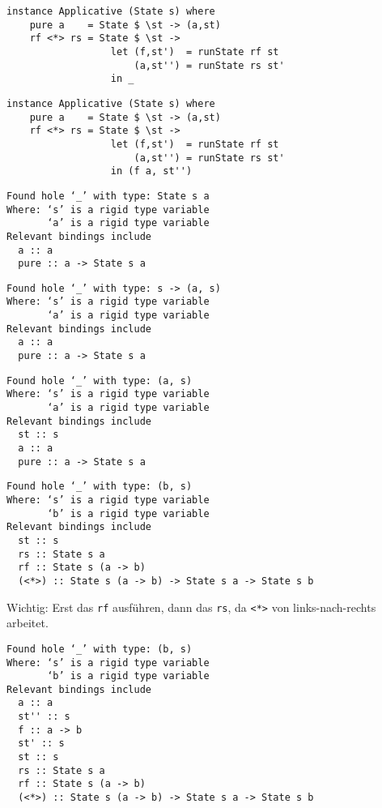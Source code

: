 \documentclass{beamer}
\begin{document}
\begin{frame}[fragile]
\begin{overprint}
\begin{verbatim}
\end{verbatim}
\begin{verbatim}
instance Applicative (State s) where
    pure a    = State $ \st -> (a,st)
    rf <*> rs = State $ \st ->
                  let (f,st')  = runState rf st
                      (a,st'') = runState rs st'
                  in _
\end{verbatim}
\begin{verbatim}
instance Applicative (State s) where
    pure a    = State $ \st -> (a,st)
    rf <*> rs = State $ \st ->
                  let (f,st')  = runState rf st
                      (a,st'') = runState rs st'
                  in (f a, st'')
\end{verbatim}
\end{overprint}
\bigskip
\scriptsize
\begin{overprint}
\begin{verbatim}
Found hole ‘_’ with type: State s a
Where: ‘s’ is a rigid type variable
       ‘a’ is a rigid type variable
Relevant bindings include
  a :: a
  pure :: a -> State s a
\end{verbatim}
\begin{verbatim}
Found hole ‘_’ with type: s -> (a, s)
Where: ‘s’ is a rigid type variable
       ‘a’ is a rigid type variable
Relevant bindings include
  a :: a
  pure :: a -> State s a
\end{verbatim}
\begin{verbatim}
Found hole ‘_’ with type: (a, s)
Where: ‘s’ is a rigid type variable
       ‘a’ is a rigid type variable
Relevant bindings include
  st :: s
  a :: a
  pure :: a -> State s a
\end{verbatim}
\begin{verbatim}
Found hole ‘_’ with type: (b, s)
Where: ‘s’ is a rigid type variable
       ‘b’ is a rigid type variable
Relevant bindings include
  st :: s
  rs :: State s a
  rf :: State s (a -> b)
  (<*>) :: State s (a -> b) -> State s a -> State s b
\end{verbatim}
\normalsize
Wichtig: Erst das \texttt{rf} ausführen, dann das \texttt{rs}, da \texttt{<*>} von links-nach-rechts arbeitet.
\scriptsize
\begin{verbatim}
Found hole ‘_’ with type: (b, s)
Where: ‘s’ is a rigid type variable
       ‘b’ is a rigid type variable
Relevant bindings include
  a :: a
  st'' :: s
  f :: a -> b
  st' :: s
  st :: s
  rs :: State s a
  rf :: State s (a -> b)
  (<*>) :: State s (a -> b) -> State s a -> State s b
\end{verbatim}
\end{overprint}
\end{frame}
\end{document}
